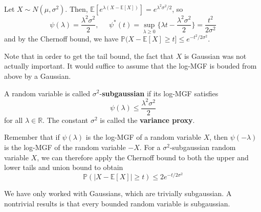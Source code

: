   \begin{example}
  Let $X \sim N(\mu, \sigma^2)$. Then, $\mathbb{E}[ e^{\lambda (X - \mathbb{E}[X])} ] = e^{\lambda^2 \sigma^2 / 2}$, so 
  \[\psi(\lambda) = \frac{\lambda^2 \sigma^2}{2}, \;\;\;\;\; \psi^* (t) = \sup_{\lambda \geq 0} \big\{ \lambda t - \frac{\lambda^2 \sigma^2}{2} \big\} = \frac{t^2}{2 \sigma^2}\]
  and by the Chernoff bound, we have $\mathbb{P}(X - \mathbb{E}[X] \geq t ] \leq e^{-t^2 / 2\sigma^2}$. 
  \end{example}

  Note that in order to get the tail bound, the fact that $X$ is Gaussian was not actually important. It would suffice to assume that the log-MGF is bouded from above by a Gaussian. 

  \begin{definition}
  A random variable is called $\sigma^2$-\textbf{subgaussian} if its log-MGF satisfies 
  \[\psi(\lambda) \leq \frac{\lambda^2 \sigma^2}{2}\]
  for all $\lambda \in \mathbb{R}$. The constant $\sigma^2$ is called the \textbf{variance proxy}. 
  \end{definition}

  Remember that if $\psi(\lambda)$ is the log-MGF of a random variable $X$, then $\psi(-\lambda)$ is the log-MGF of the random variable $-X$. For a $\sigma^2$-subgaussian random variable $X$, we can therefore apply the Chernoff bound to both the upper and lower tails and union bound to obtain 
  \[\mathbb{P}(|X - \mathbb{E}[X]| \geq t ) \leq 2 e^{-t/2\sigma^2}\]

  We have only worked with Gaussians, which are trivially subgaussian. A nontrivial results is that every bounded random variable is subgaussian. 

